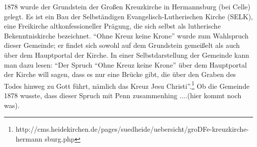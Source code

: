 \medskip

1878 wurde der Grundstein der Großen Kreuzkirche in Hermannsburg (bei Celle)
gelegt. Es ist ein Bau der Selbständigen Evangelisch-Lutherischen Kirche (SELK),
eine Freikirche altkonfessioneller Prägung, die sich selbst als lutherische
Bekenntniskirche bezeichnet. "`Ohne Kreuz keine Krone"' wurde zum Wahlspruch
dieser Gemeinde; er findet sich sowohl auf dem Grundstein gemeißelt als auch
über dem Hauptportal der Kirche. In einer Selbstdarstellung der Gemeinde kann
man dazu lesen: "`Der Spruch "`Ohne Kreuz keine Krone"' über dem Hauptportal der
Kirche will sagen, dass es nur eine Brücke gibt, die über den Graben des Todes
hinweg zu Gott führt, nämlich das Kreuz Jesu
Christi"'.\footnote{
http://cms.heidekirchen.de/pages/suedheide/uebersicht/groDFe-kreuzkirche-hermann
sburg.php} Ob die Gemeinde 1878
wusste, dass dieser Spruch mit Penn zusammenhing ....(hier kommt noch was).

\medskip

